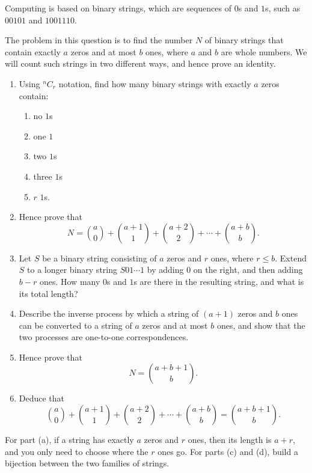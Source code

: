\begin{problem}
Computing is based on binary strings, which are sequences of $0$s and $1$s, such as $00101$ and $1001110$.

The problem in this question is to find the number $N$ of binary strings that contain exactly $a$ zeros and at most $b$ ones, where $a$ and $b$ are whole numbers. We will count such strings in two different ways, and hence prove an identity.

\begin{enumerate}[label=\alph*)]
\item Using ${}^nC_r$ notation, find how many binary strings with exactly $a$ zeros contain:
\begin{enumerate}[label=\roman*)]
\item no $1$s
\item one $1$
\item two $1$s
\item three $1$s
\item $r$ $1$s.
\end{enumerate}

\item Hence prove that
\[
N=\binom{a}{0}+\binom{a+1}{1}+\binom{a+2}{2}+\cdots+\binom{a+b}{b}.
\]

\item Let $S$ be a binary string consisting of $a$ zeros and $r$ ones, where $r\le b$. Extend $S$ to a longer binary string $S01\cdots 1$ by adding $0$ on the right, and then adding $b-r$ ones. How many $0$s and $1$s are there in the resulting string, and what is its total length?

\item Describe the inverse process by which a string of $(a+1)$ zeros and $b$ ones can be converted to a string of $a$ zeros and at most $b$ ones, and show that the two processes are one-to-one correspondences.

\item Hence prove that
\[
N=\binom{a+b+1}{b}.
\]

\item Deduce that
\[
\binom{a}{0}+\binom{a+1}{1}+\binom{a+2}{2}+\cdots+\binom{a+b}{b}
=
\binom{a+b+1}{b}.
\]
\end{enumerate}
\end{problem}

\begin{hint}
For part (a), if a string has exactly $a$ zeros and $r$ ones, then its length is $a+r$, and you only need to choose where the $r$ ones go. For parts (c) and (d), build a bijection between the two families of strings.
\end{hint}

